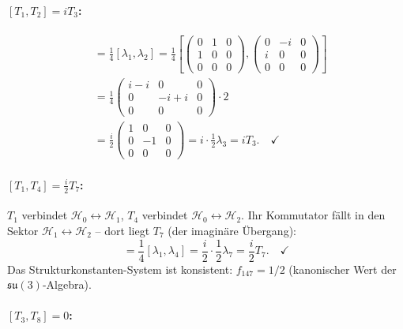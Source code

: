 \paragraph{$[T_1, T_2] = iT_3$:}
\begin{align}
  [T_1,T_2] &= \frac{1}{4}[\lambda_1,\lambda_2]
  = \frac{1}{4}
  \left[
  \begin{pmatrix}0&1&0\\1&0&0\\0&0&0\end{pmatrix},
  \begin{pmatrix}0&-i&0\\i&0&0\\0&0&0\end{pmatrix}
  \right] \nonumber \\
  &= \frac{1}{4}
  \begin{pmatrix}i-i&0&0\\0&-i+i&0\\0&0&0\end{pmatrix}
  \cdot 2 \nonumber \\
  &= \frac{i}{2}
  \begin{pmatrix}1&0&0\\0&-1&0\\0&0&0\end{pmatrix}
  = i\cdot\frac{1}{2}\lambda_3 = iT_3.\quad\checkmark
  \label{eq:komm_12}
\end{align}

\paragraph{$[T_1, T_4] = \frac{i}{2}T_7$:}

$T_1$ verbindet $\mathcal{H}_0\leftrightarrow\mathcal{H}_1$,
$T_4$ verbindet $\mathcal{H}_0\leftrightarrow\mathcal{H}_2$.
Ihr Kommutator fällt in den Sektor
$\mathcal{H}_1\leftrightarrow\mathcal{H}_2$ -- dort liegt $T_7$
(der imaginäre Übergang):
\begin{equation}
  [T_1,T_4] = \frac{1}{4}[\lambda_1,\lambda_4]
  = \frac{i}{2}\cdot\frac{1}{2}\lambda_7
  = \frac{i}{2}T_7.\quad\checkmark
  \label{eq:komm_14}
\end{equation}
Das Strukturkonstanten-System ist konsistent:
$f_{147} = 1/2$ (kanonischer Wert der $\mathfrak{su}(3)$-Algebra).

\paragraph{$[T_3, T_8] = 0$:}

